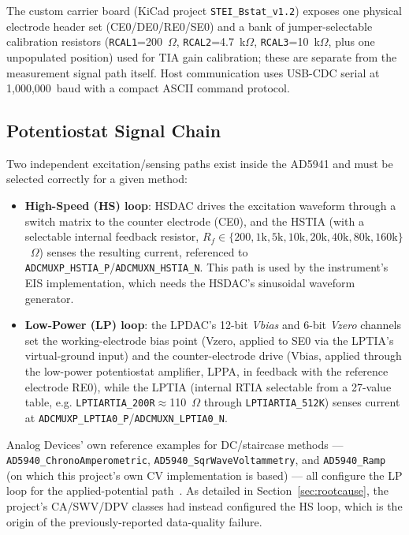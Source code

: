 \documentclass[journal]{IEEEtran}
\begin{document}
The custom carrier board (KiCad project \texttt{STEI\_Bstat\_v1.2}) exposes one physical electrode header set (CE0/DE0/RE0/SE0) and a bank of jumper-selectable calibration resistors (\texttt{RCAL1}=200~$\Omega$, \texttt{RCAL2}=4.7~k$\Omega$, \texttt{RCAL3}=10~k$\Omega$, plus one unpopulated position) used for TIA gain calibration; these are separate from the measurement signal path itself. Host communication uses USB-CDC serial at 1{,}000{,}000~baud with a compact ASCII command protocol.

\subsection{Potentiostat Signal Chain}
Two independent excitation/sensing paths exist inside the AD5941 and must be selected correctly for a given method:
\begin{itemize}
\item \textbf{High-Speed (HS) loop}: HSDAC drives the excitation waveform through a switch matrix to the counter electrode (CE0), and the HSTIA (with a selectable internal feedback resistor, $R_{f}\in\{200,1\text{k},5\text{k},10\text{k},20\text{k},40\text{k},80\text{k},160\text{k}\}$~$\Omega$) senses the resulting current, referenced to \texttt{ADCMUXP\_HSTIA\_P}/\texttt{ADCMUXN\_HSTIA\_N}. This path is used by the instrument's EIS implementation, which needs the HSDAC's sinusoidal waveform generator.
\item \textbf{Low-Power (LP) loop}: the LPDAC's 12-bit \emph{Vbias} and 6-bit \emph{Vzero} channels set the working-electrode bias point (Vzero, applied to SE0 via the LPTIA's virtual-ground input) and the counter-electrode drive (Vbias, applied through the low-power potentiostat amplifier, LPPA, in feedback with the reference electrode RE0), while the LPTIA (internal RTIA selectable from a 27-value table, e.g. \texttt{LPTIARTIA\_200R}$\approx$110~$\Omega$ through \texttt{LPTIARTIA\_512K}) senses current at \texttt{ADCMUXP\_LPTIA0\_P}/\texttt{ADCMUXN\_LPTIA0\_N}.
\end{itemize}
Analog Devices' own reference examples for DC/staircase methods --- \texttt{AD5940\_ChronoAmperometric}, \texttt{AD5940\_SqrWaveVoltammetry}, and \texttt{AD5940\_Ramp} (on which this project's own CV implementation is based) --- all configure the LP loop for the applied-potential path~\cite{ref:ad5940examples}. As detailed in Section~\ref{sec:rootcause}, the project's CA/SWV/DPV classes had instead configured the HS loop, which is the origin of the previously-reported data-quality failure.
\end{document}
